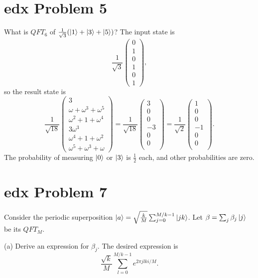 \documentclass[10pt]{article}
\begin{document}
\section*{edx Problem 5}
What is $QFT_6$ of $\frac{1}{\sqrt{3}} ( \ket{1} + \ket{3} + \ket{5} )$? The input state is
\[
\frac{1}{\sqrt{3}}
\begin{pmatrix}
0 \\ 1 \\ 0 \\ 1 \\ 0 \\ 1 
\end{pmatrix},
\] 
so the result state is 
\[
\frac{1}{\sqrt{18}}
\begin{pmatrix}
3 \\
\omega + \omega^3 + \omega^5 \\
\omega^2 + 1 + \omega^4 \\
3 \omega^3 \\
\omega^4 + 1 + \omega^2 \\
\omega^5 + \omega^3 + \omega
\end{pmatrix}
= 
\frac{1}{\sqrt{18}}
\begin{pmatrix}
3 \\ 0 \\ 0 \\ -3 \\ 0 \\ 0 \\
\end{pmatrix}
= 
\frac{1}{\sqrt{2}}
\begin{pmatrix}
1 \\ 0 \\ 0 \\ -1 \\ 0 \\ 0 \\
\end{pmatrix}.
\]
 The probability of measuring $\ket{0}$ or $\ket{3}$ is $\frac{1}{2}$ each, and other probabilities are zero.
 
\section*{edx Problem 7}
Consider the periodic superposition $\ket{a} = \sqrt{\frac{k}{M}} \sum_{j = 0}^{M/k - 1} \ket{jk}$. Let $\beta = \sum_j \beta_j \ket{j}$ be its $QFT_M$.

(a) Derive an expression for $\beta_j$. The desired expression is
\[
\frac{\sqrt{k}}{M} \sum_{l = 0}^{M/k - 1} e^{2\pi j l k i/M}.
\] 
\end{document}
